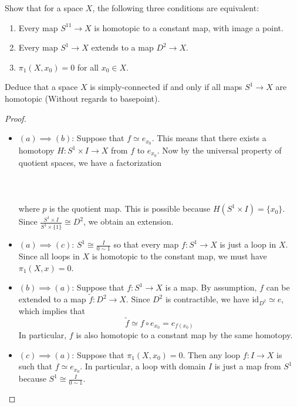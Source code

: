 \documentclass[a4paper]{article}
\begin{document}
\begin{ex}{}{} Show that for a space $X$, the following three conditions are equivalent: 
\begin{enumerate}[label=(\alph*)]
\item Every map $S^11\to X$ is homotopic to a constant map, with image a point. 
\item Every map $S^1\to X$ extends to a map $D^2\to X$. 
\item $\pi_1(X,x_0)=0$ for all $x_0\in X$. 
\end{enumerate} 
Deduce that a space $X$ is simply-connected if and only if all maps $S^1\to X$ are homotopic (Without regards to basepoint). \tcbline
\begin{proof}~\\
\begin{itemize}
\item $(a)\implies(b)$: Suppose that $f\simeq e_{x_0}$. This means that there exists a homotopy $H:S^1\times I\to X$ from $f$ to $e_{x_0}$. Now by the universal property of quotient spaces, we have a factorization \\~\\
\\~\\
where $p$ is the quotient map. This is possible because $H(S^1\times I)=\{x_0\}$. Since $\frac{S^1\times I}{S^1\times\{1\}}\cong D^2$, we obtain an extension. 

\item $(a)\implies(c)$: $S^1\cong\frac{I}{0\sim 1}$ so that every map $f:S^1\to X$ is just a loop in $X$. Since all loops in $X$ is homotopic to the constant map, we must have $\pi_1(X,x)=0$. 

\item $(b)\implies(a)$: Suppose that $f:S^1\to X$ is a map. By assumption, $f$ can be extended to a map $\tilde{f}:D^2\to X$. Since $D^2$ is contractible, we have $\text{id}_{D^2}\simeq e$, which implies that $$\tilde{f}\simeq f\circ e_{x_0}=e_{f(x_0)}$$ In particular, $f$ is also homotopic to a constant map by the same homotopy. 

\item $(c)\implies(a)$: Suppose that $\pi_1(X,x_0)=0$. Then any loop $f:I\to X$ is such that $f\simeq e_{x_0}$. In particular, a loop with domain $I$ is just a map from $S^1$ because $S^1\cong\frac{I}{0\sim1}$. 
\end{itemize} 


\end{proof}
\end{ex}
\end{document}
